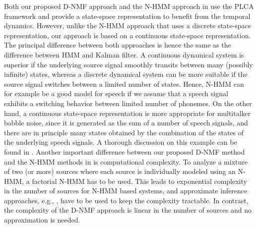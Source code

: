 \documentclass[10pt,twocolumn,twoside] {IEEEtran}
\begin{document}
Both our proposed D-NMF approach and the N-HMM approach in \cite{Mysore2010} use
the PLCA framework and provide a state-space representation to benefit
from the temporal dynamics. However, unlike the N-HMM approach that uses a
discrete state-space representation, our approach is based on a continuous state-space representation. The principal difference between both approaches is hence
the same as the difference between HMM and Kalman filter. A continuous
dynamical system is superior if the underlying source signal smoothly
transits between many (possibly infinite) states, whereas a discrete
dynamical system can be more suitable if the source signal switches between a limited number
of states. Hence, N-HMM can for example be a good model for speech if we
assume that a speech signal exhibits a switching behavior between limited number
of phonemes. On the other hand, a continuous state-space representation is more appropriate
for multitalker babble noise, since it is generated as the sum of a number of speech signals, and there are in principle many states obtained by
the combination of the states of the underlying speech signals. A thorough discussion on this example can be found in \cite{Mohammadiha2013c}.
Another important difference between our proposed D-NMF method and the N-HMM methods in \cite{Mysore2010,Mohammadiha2013c} is computational complexity. To analyze
a mixture of two (or more) sources where each source is individually
modeled using an N-HMM, a factorial N-HMM has to be used. This leads
to exponential complexity in the number of sources for N-HMM based
systems, and approximate inference approaches, e.g., \cite{Mysore2012},
have to be used to keep the complexity tractable. In contrast, the
complexity of the D-NMF approach is linear in the number of sources and no approximation is needed.
\end{document}

